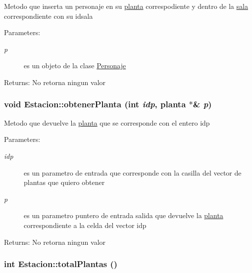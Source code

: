 Metodo que inserta un personaje en su \hyperlink{classplanta}{planta} correspodiente y dentro de la \hyperlink{classsala}{sala} correspondiente con su idsala \begin{Desc}
\item[Parameters:]
\begin{description}
\item[{\em p}]es un objeto de la clase \hyperlink{classPersonaje}{Personaje} \end{description}
\end{Desc}
\begin{Desc}
\item[Returns:]No retorna ningun valor \end{Desc}
\hypertarget{classEstacion_846fcf5591b3a021072365cfd7902b4c}{
\subsubsection[obtenerPlanta]{\setlength{\rightskip}{0pt plus 5cm}void Estacion::obtenerPlanta (int {\em idp}, \/  {\bf planta} $\ast$\& {\em p})}}
\label{classEstacion_846fcf5591b3a021072365cfd7902b4c}


Metodo que devuelve la \hyperlink{classplanta}{planta} que se corresponde con el entero idp \begin{Desc}
\item[Parameters:]
\begin{description}
\item[{\em idp}]es un parametro de entrada que corresponde con la casilla del vector de plantas que quiero obtener \item[{\em p}]es un parametro puntero de entrada salida que devuelve la \hyperlink{classplanta}{planta} correspondiente a la celda del vector idp \end{description}
\end{Desc}
\begin{Desc}
\item[Returns:]No retorna ningun valor \end{Desc}
\hypertarget{classEstacion_5ab63daf24099fe7f461049191c5f45a}{
\subsubsection[totalPlantas]{\setlength{\rightskip}{0pt plus 5cm}int Estacion::totalPlantas ()}}
\label{classEstacion_5ab63daf24099fe7f461049191c5f45a}


